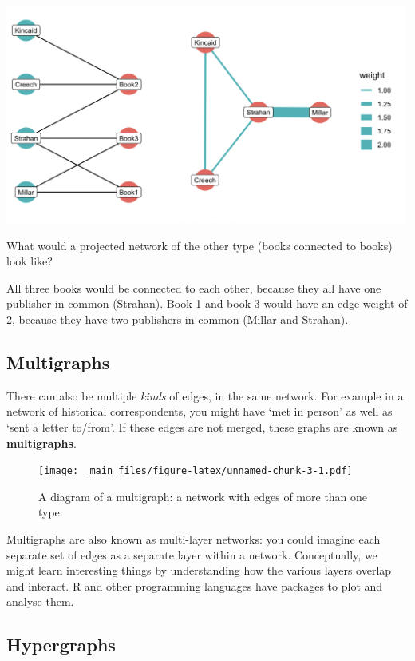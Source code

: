 \documentclass[
]{book}
\begin{document}
\includegraphics[width=5.20833in,height=\textheight]{images/bipartite.png}

What would a projected network of the other type (books connected to books) look like?

All three books would be connected to each other, because they all have one publisher in common (Strahan). Book 1 and book 3 would have an edge weight of 2, because they have two publishers in common (Millar and Strahan).

\hypertarget{multigraphs}{%
\subsection{Multigraphs}\label{multigraphs}}

There can also be multiple \emph{kinds} of edges, in the same network. For example in a network of historical correspondents, you might have `met in person' as well as `sent a letter to/from'. If these edges are not merged, these graphs are known as \textbf{multigraphs}.

\begin{figure}
\centering
\texttt{[image: \_main\_files/figure-latex/unnamed-chunk-3-1.pdf]}
\caption{\label{fig:unnamed-chunk-3}A diagram of a multigraph: a network with edges of more than one type.}
\end{figure}

Multigraphs are also known as multi-layer networks: you could imagine each separate set of edges as a separate layer within a network. Conceptually, we might learn interesting things by understanding how the various layers overlap and interact. R and other programming languages have packages to plot and analyse them.

\hypertarget{hypergraphs}{%
\subsection{Hypergraphs}\label{hypergraphs}}
\end{document}
